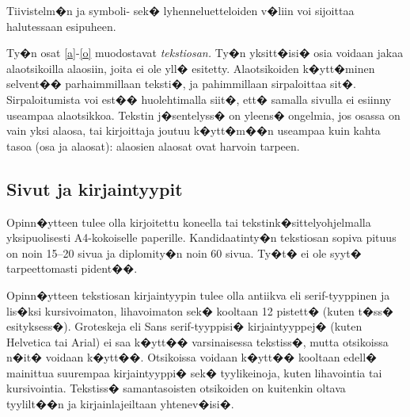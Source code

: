 \documentclass[finnish,12pt,a4paper,pdftex]{article}
\begin{document}
Tiivistelm�n ja symboli- sek� lyhenneluetteloiden 
v�liin voi sijoittaa halutessaan esipuheen.  

Ty�n osat \ref{a}-\ref{o} muodostavat \textit{tekstiosan.}  Ty�n
yksitt�isi� osia voidaan jakaa alaotsikoilla alaosiin, joita ei ole
yll� esitetty. Alaotsikoiden k�ytt�minen selvent�� parhaimmillaan
teksti�, ja pahimmillaan sirpaloittaa sit�.  Sirpaloitumista voi est��
huolehtimalla siit�, ett� samalla sivulla ei esiinny useampaa
alaotsikkoa.  Tekstin j�sentelyss� on yleens� ongelmia, jos osassa on
vain yksi alaosa, tai kirjoittaja joutuu k�ytt�m��n useampaa kuin
kahta tasoa (osa ja alaosat): alaosien alaosat ovat harvoin tarpeen.
\subsection*{Sivut ja kirjaintyypit}

Opinn�ytteen tulee olla kirjoitettu koneella tai
tekstink�sittelyohjelmalla yksipuolisesti A4-kokoiselle paperille.
Kandidaatinty�n tekstiosan sopiva pituus on noin 15--20 sivua ja
diplomity�n noin 60 sivua. Ty�t� ei ole syyt� tarpeettomasti pident��.

Opinn�ytteen tekstiosan kirjaintyypin tulee olla antiikva eli
serif\--tyyp\-pi\-nen ja lis�ksi kursivoimaton, lihavoimaton sek� kooltaan 12
pistett� (kuten t�ss� esityksess�). Groteskeja eli \textsf{Sans
  serif}-tyyppisi� kirjaintyyppej� (kuten Helvetica tai Arial) ei saa
k�ytt�� varsinaisessa tekstiss�, mutta otsikoissa n�it� voidaan
k�ytt��.  Otsikoissa voidaan k�ytt�� kooltaan edell� mainittua
suurempaa kirjaintyyppi� sek� tyylikeinoja, kuten lihavointia tai
kursivointia.  Tekstiss� samantasoisten otsikoiden on kuitenkin oltava
tyylilt��n ja kirjainlajeiltaan yhtenev�isi�.
\begin{table}[htb]
\caption{Taulukoissa ja kuvissa kirjaintyypin voi valita
tarkoituksenmukaisesti, mutta kuva- ja taulukkoteksteiss� tulee
k�ytt�� samaa kirjaintyyppi� kuin varsinaisessa tekstiss�. 
Huomaa taulukon numeroinnin sijoittuminen taulukon yl�puolelle. \label{taulukko1}}
\begin{center}
\end{center}
\end{table}
\end{document}
